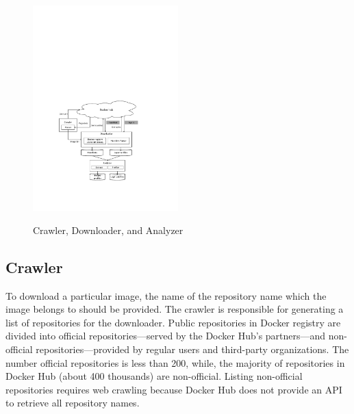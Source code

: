 \begin{figure}
	\centering
	\includegraphics[width=0.5\textwidth]{graphs/fig-downloader-analyzer.pdf}\\
	\caption{Crawler, Downloader, and Analyzer
		}
	\label{fig-downloader-analyzer}
\end{figure}

%
\subsection{Crawler}
\label{sec:crawler}

%
To download a particular image, %
the name of the repository name which the image belongs to should be provided.
The crawler is responsible
for generating a list of repositories for the downloader.
%
%
%
%
Public repositories in Docker registry are divided into official
repositories---served by the Docker Hub's partners---and non-official
repositories---provided
by regular users and third-party organizations.
%
%
The number official repositories is less than 200,
while, the majority
of repositories in Docker Hub (about 400 thousands)
are non-official.
Listing non-official repositories requires web crawling because
Docker Hub does not provide an API to retrieve all repository names.

